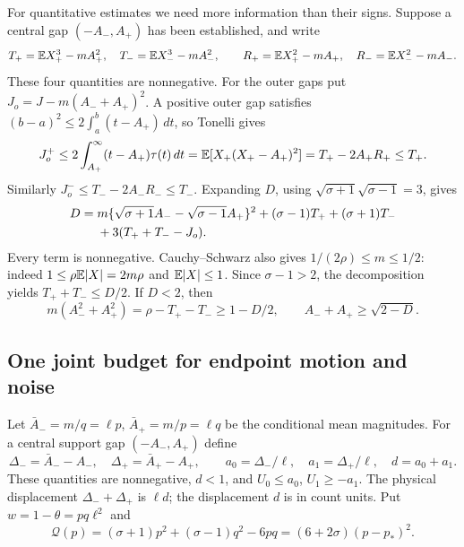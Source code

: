 For quantitative estimates we need more information than their signs.
Suppose a central gap $(-A_-,A_+)$ has been established,
and write
\[
 T_+=\mathbb E X_+^3-mA_+^2,\quad T_-=\mathbb E X_-^3-mA_-^2,\qquad
 R_+=\mathbb E X_+^2-mA_+,\quad R_-=\mathbb E X_-^2-mA_-.
\]
These four quantities are nonnegative. For the outer gaps put
$J_o=J-m(A_-+A_+)^2$. A positive outer gap satisfies
$(b-a)^2\le2\int_a^b(t-A_+)\,dt$, so Tonelli gives
\[
 J_o^+\le2\int_{A_+}^\infty(t-A_+)\tau(t)\,dt
       =\mathbb E[X_+(X_+-A_+)^2]=T_+-2A_+R_+\le T_+.
\]
Similarly $J_o^-\le T_--2A_-R_-\le T_-$.
Expanding $D$, using $\sqrt{\sigma+1}\sqrt{\sigma-1}=3$, gives
\begin{align}
 D={}&m\{\sqrt{\sigma+1}A_--\sqrt{\sigma-1}A_+\}^2
       +(\sigma-1)T_++(\sigma+1)T_-\notag\\
    &+3(T_++T_--J_o).\label{ms:defect-decomposition}
\end{align}
Every term is nonnegative. Cauchy--Schwarz also gives
$1/(2\rho)\le m\le1/2$: indeed $1\le\rho\mathbb E|X|=2m\rho$ and
$\mathbb E|X|\le1$. Since $\sigma-1>2$, the decomposition yields
$T_++T_-\le D/2$. If $D<2$, then
\[
 m(A_-^2+A_+^2)=\rho-T_+-T_-\ge1-D/2,
 \qquad A_-+A_+\ge\sqrt{2-D}.
\]

\subsection{One joint budget for endpoint motion and noise}

Let $\bar A_-=m/q=\ell p$, $\bar A_+=m/p=\ell q$ be the conditional mean
magnitudes. For a central support gap $(-A_-,A_+)$ define
\[
 \Delta_-=\bar A_--A_-,\quad \Delta_+=\bar A_+-A_+,\qquad
 a_0=\Delta_-/\ell,\quad a_1=\Delta_+/\ell,\quad d=a_0+a_1.
\]
These quantities are nonnegative, $d<1$, and
$U_0\le a_0$, $U_1\ge-a_1$. The physical displacement
$\Delta_-+\Delta_+$ is $\ell d$; the displacement $d$ is in count units.
Put $w=1-\theta=pq\ell^2$ and
\[
 \mathcal Q(p)=(\sigma+1)p^2+(\sigma-1)q^2-6pq
       =(6+2\sigma)(p-p_*)^2.
\]

